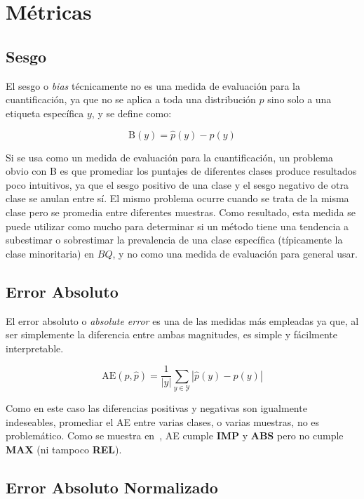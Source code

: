 \section{Métricas}

\subsection{Sesgo}

El sesgo o {\it bias\/} técnicamente no es una medida de evaluación para la
cuantificación, ya que no se aplica a toda una distribución $p$ sino solo a una
etiqueta específica $y$, y se define como:

\begin{equation}
    {\text{B}(y)} = \hat p(y) - p(y)
\end{equation}

Si se usa como un medida de evaluación para la cuantificación, un problema obvio
con B es que promediar los puntajes de diferentes clases produce resultados poco
intuitivos, ya que el sesgo positivo de una clase y el sesgo negativo de otra
clase se anulan entre sí. El mismo problema ocurre cuando se trata de la misma
clase pero se promedia entre diferentes muestras. Como resultado, esta medida se
puede utilizar como mucho para determinar si un método tiene una tendencia a
subestimar o sobrestimar la prevalencia de una clase específica (típicamente la
clase minoritaria) en $BQ$, y no como una medida de evaluación para general
usar.

\subsection{Error Absoluto}

El error absoluto o {\it absolute error\/} es una de las medidas más empleadas
ya que, al ser simplemente la diferencia entre ambas magnitudes, es simple y
fácilmente interpretable.

\begin{equation}
    {\text{AE}(p, \hat p)} = \frac{1}{|y|}\sum _{y\in {\mathcal {Y}}}{|\hat p(y) - p(y)|}
\end{equation}

Como en este caso las diferencias positivas y negativas son igualmente
indeseables, promediar el AE entre varias clases, o varias muestras, no es
problemático. Como se muestra en~\cite{sebastiani2020evaluation}, AE cumple {\bf
IMP} y {\bf ABS} pero no cumple {\bf MAX} (ni tampoco {\bf REL}).

\subsection{Error Absoluto Normalizado}

